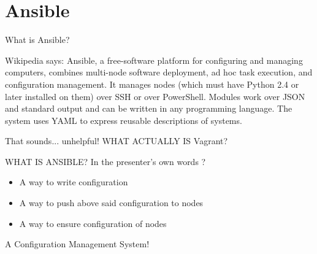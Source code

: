 \documentclass{beamer}
\begin{document}
\section{Ansible}
    \begin{frame}{What is Ansible?}
    \begin{block}{Wikipedia says:}
	    Ansible, a free-software platform for configuring and managing computers, combines multi-node software deployment,
	    ad hoc task execution, and configuration management. It manages nodes (which must have Python 2.4 or later installed on them)
	    over SSH or over PowerShell. Modules work over JSON and standard output and can be written in any programming language.
	    The system uses YAML to express reusable descriptions of systems.
    \end{block}
    \pause That sounds... unhelpful! WHAT ACTUALLY IS Vagrant?
    \end{frame}

    \begin{frame}{WHAT IS ANSIBLE?}
	In the presenter's own words ?
        \begin{itemize}
	    \pause \item A way to write configuration
	    \pause \item A way to push above said configuration to nodes
	    \pause \item A way to ensure configuration of nodes
        \end{itemize}
	\begin{center}
		\pause A Configuration Management System!
	\end{center}
    \end{frame}
\end{document}
